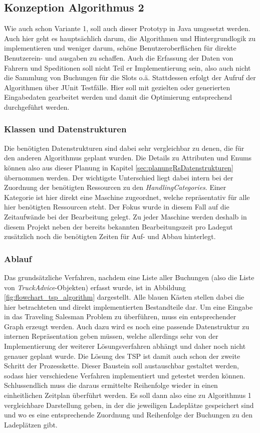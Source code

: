 \subsection{Konzeption Algorithmus 2}

Wie auch schon Variante 1, soll auch dieser Prototyp in Java umgesetzt werden. Auch hier geht es hauptsächlich darum, die Algorithmen und Hintergrundlogik zu implementieren und weniger darum, schöne Benutzeroberflächen für direkte Benutzerein- und ausgaben zu schaffen. Auch die Erfassung der Daten von Fahrern und Speditionen soll nicht Teil er Implementierung sein, also auch nicht die Sammlung von Buchungen für die Slots o.ä. Stattdessen erfolgt der Aufruf der Algorithmen über JUnit Testfälle. Hier soll mit gezielten oder generierten Eingabedaten gearbeitet werden und damit die Optimierung entsprechend durchgeführt werden.

\subsubsection{Klassen und Datenstrukturen}

Die benötigten Datenstrukturen sind dabei sehr vergleichbar zu denen, die für den anderen Algorithmus geplant wurden. Die Details zu Attributen und Enums können also aus dieser Planung in Kapitel \ref{sec:planungRsDatenstrukturen} übernommen werden. Der wichtigste Unterschied liegt dabei intern bei der Zuordnung der benötigten Ressourcen zu den \textit{HandlingCategories}. Einer Kategorie ist hier direkt eine Maschine zugeordnet, welche repräsentativ für alle hier benötigten Ressourcen steht. Der Fokus wurde in diesem Fall auf die Zeitaufwände bei der Bearbeitung gelegt. Zu jeder Maschine werden deshalb in diesem Projekt neben der bereits bekannten Bearbeitungszeit pro Ladegut zusätzlich noch die benötigten Zeiten für Auf- und Abbau hinterlegt. 


\subsubsection{Ablauf}

Das grundsätzliche Verfahren, nachdem eine Liste aller Buchungen (also die Liste von \textit{TruckAdvice}-Objekten) erfasst wurde, ist in Abbildung \ref{fig:flowchart_tsp_algorithm} dargestellt. Alle blauen Kästen stellen dabei die hier betrachteten und direkt implementierten Bestandteile dar. Um eine Eingabe in das Traveling Salesman Problem zu überführen, muss ein entsprechender Graph erzeugt werden. Auch dazu wird es noch eine passende Datenstruktur zu internen Repräsentation geben müssen, welche allerdings sehr von der Implementierung der weiterer Lösungsverfahren abhängt und daher noch nicht genauer geplant wurde. Die Lösung des TSP ist damit auch schon der zweite Schritt der Prozesskette. Dieser Baustein soll austauschbar gestaltet werden, sodass hier verschiedene Verfahren implementiert und getestet werden können. Schlussendlich muss die daraus ermittelte Reihenfolge wieder in einen einheitlichen Zeitplan überführt werden. Es soll dann also eine zu Algorithmus 1 vergleichbare Darstellung geben, in der die jeweiligen Ladeplätze gespeichert sind und wo es eine entsprechende Zuordnung und Reihenfolge der Buchungen zu den Ladeplätzen gibt.

